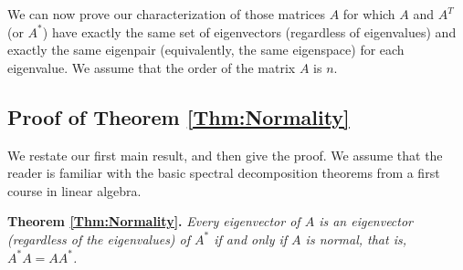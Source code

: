\documentclass{article}
\newtheorem{theorem}{Theorem}
\begin{document}
We can now prove our characterization of those matrices  $A$ for which  $A$ and $A^T$ (or $A^*$) have exactly the same set of  eigenvectors (regardless of eigenvalues) and exactly the same eigenpair (equivalently, the same eigenspace) for each eigenvalue. We assume that the order of the matrix $A$ is $n$.



\subsection{Proof of Theorem \ref{Thm:Normality}} We restate our first main result, and then give the proof.  We assume that the reader is familiar with the basic spectral decomposition theorems from a first course in linear algebra.
\medskip

\noindent \textbf{Theorem \ref{Thm:Normality}.} \emph{Every eigenvector  of $A$ is an eigenvector (regardless of the eigenvalues)
of $A^*$ if and only if $A$ is normal,
that is,  $A^*A=AA^*$.}


\end{document}
